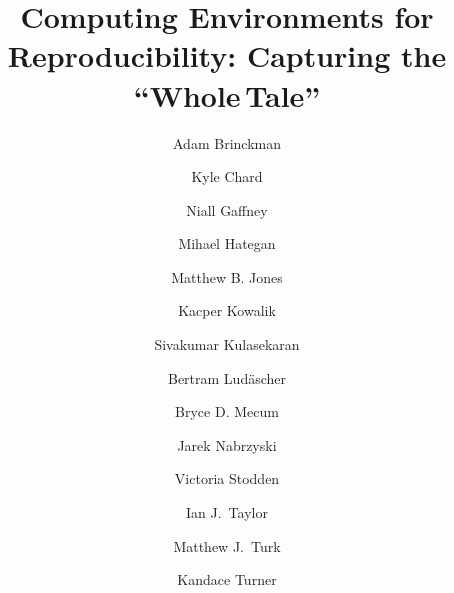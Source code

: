 \documentclass[review]{elsarticle}
\newcommand{\wt}{Whole\,Tale}
\begin{document}
\begin{frontmatter}

\title{Computing Environments for Reproducibility: Capturing the ``\wt''}




\author[address5]{Adam Brinckman}
\author[address2]{Kyle Chard}
\author[address3]{Niall Gaffney}
\author[address2]{Mihael Hategan}
\author[address4]{Matthew B. Jones}
\author[address6]{Kacper Kowalik}
\author[address3]{Sivakumar Kulasekaran}
\author[address1,address6]{Bertram Lud\"ascher}
\author[address4]{Bryce D. Mecum}
\author[address5]{Jarek Nabrzyski}
\author[address1,address6]{Victoria Stodden}
\author[address5,address7]{Ian J.~Taylor}
\author[address1,address6]{Matthew J.~Turk}
\author[address6]{Kandace Turner}  
\address[address1]{School of Information Sciences, University of Illinois at Urbana-Champaign}
\address[address2]{Computation Institute, University of Chicago and Argonne National Laboratory}
\address[address3]{Texas Advanced Computing Center, University of Texas at Austin}
\address[address4]{National Center for Ecological Analysis and Synthesis, University of California at Santa Barbara}
\address[address5]{Center for Research Computing, University of Notre Dame}
\address[address6]{National Center for Supercomputing Applications, University of Illinois at Urbana-Champaign}
\address[address7]{School of Computer Science, Cardiff University, Cardiff, UK}




\end{frontmatter}
\end{document}
